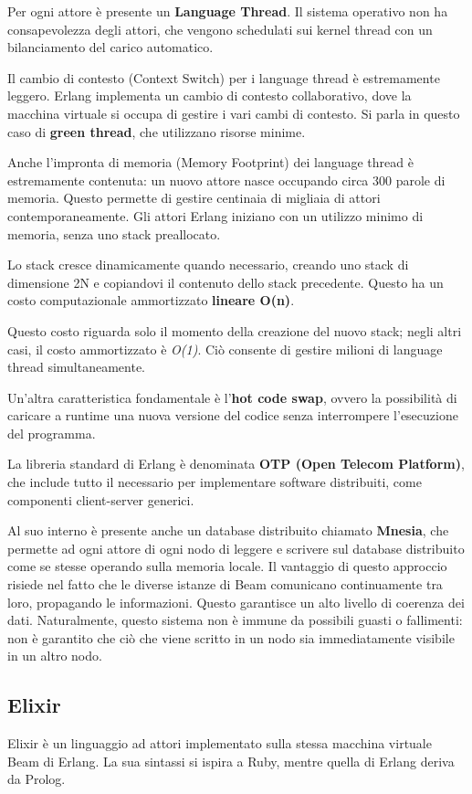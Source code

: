 \documentclass{article}
\begin{document}
Per ogni attore è presente un \textbf{Language Thread}. Il sistema operativo non ha consapevolezza degli attori, che vengono schedulati sui kernel thread con un bilanciamento del carico automatico.

Il cambio di contesto (Context Switch) per i language thread è estremamente leggero. Erlang implementa un cambio di contesto collaborativo, dove la macchina virtuale si occupa di gestire i vari cambi di contesto. Si parla in questo caso di \textbf{green thread}, che utilizzano risorse minime.

Anche l'impronta di memoria (Memory Footprint) dei language thread è estremamente contenuta: un nuovo attore nasce occupando circa 300 parole di memoria. Questo permette di gestire centinaia di migliaia di attori contemporaneamente. Gli attori Erlang iniziano con un utilizzo minimo di memoria, senza uno stack preallocato.

Lo stack cresce dinamicamente quando necessario, creando uno stack di dimensione 2N e copiandovi il contenuto dello stack precedente. Questo ha un costo computazionale ammortizzato \textbf{lineare O(n)}.

Questo costo riguarda solo il momento della creazione del nuovo stack; negli altri casi, il costo ammortizzato è \textit{O(1)}. Ciò consente di gestire milioni di language thread simultaneamente.

Un'altra caratteristica fondamentale è l'\textbf{hot code swap}, ovvero la possibilità di caricare a runtime una nuova versione del codice senza interrompere l'esecuzione del programma.

La libreria standard di Erlang è denominata \textbf{OTP (Open Telecom Platform)}, che include tutto il necessario per implementare software distribuiti, come componenti client-server generici.

Al suo interno è presente anche un database distribuito chiamato \textbf{Mnesia}, che permette ad ogni attore di ogni nodo di leggere e scrivere sul database distribuito come se stesse operando sulla memoria locale. Il vantaggio di questo approccio risiede nel fatto che le diverse istanze di Beam comunicano continuamente tra loro, propagando le informazioni. Questo garantisce un alto livello di coerenza dei dati. Naturalmente, questo sistema non è immune da possibili guasti o fallimenti: non è garantito che ciò che viene scritto in un nodo sia immediatamente visibile in un altro nodo.

\subsection*{Elixir}
Elixir è un linguaggio ad attori implementato sulla stessa macchina virtuale Beam di Erlang. La sua sintassi si ispira a Ruby, mentre quella di Erlang deriva da Prolog.
\end{document}
